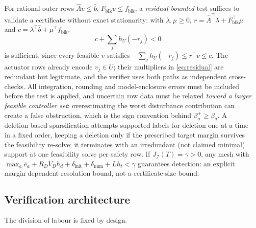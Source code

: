 \documentclass[11pt,a4paper]{article}
\theoremstyle{plain}
\theoremstyle{definition}
\theoremstyle{remark}
\newcommand{\calI}{\mathcal{I}}
\newcommand{\J}{J_{\calI}(T)}
\newcommand{\ebar}{\bar{e}}
\begin{document}
For rational outer rows $\widehat Av\le\widehat b$, $F_{\mathrm{blk}}v\le f_{\mathrm{blk}}$, a \emph{residual-bounded} test suffices to validate a certificate without exact stationarity: with $\lambda,\mu\ge0$, $r=\widehat A^\top\lambda+F_{\mathrm{blk}}^\top\mu$ and $c=\lambda^\top\widehat b+\mu^\top f_{\mathrm{blk}}$,
\begin{equation}\label{eq:residual}
c+\sum_jh_U(-r_j)<0
\end{equation}
is sufficient, since every feasible $v$ satisfies $-\sum_jh_U(-r_j)\le r^\top v\le c$. The actuator rows already encode $v_j\in U$; their multipliers in \eqref{eq:residual} are redundant but legitimate, and the verifier uses both paths as independent cross-checks. All integration, rounding and model-enclosure errors must be included before the test is applied, and uncertain row data must be relaxed \emph{toward a larger feasible controller set}: overestimating the worst disturbance contribution can create a false obstruction, which is the sign convention behind $\beta^+_a\ge\beta_a$. A deletion-based sparsification attempts supported labels for deletion one at a time in a fixed order, keeping a deletion only if the prescribed target margin survives the feasibility re-solve; it terminates with an irredundant (not claimed minimal) support at one feasibility solve per safety row. If $\J=\gamma>0$, any mesh with $\max_a\ebar_a+R_DV_Dh_d+\delta_{\mathrm{init}}+\delta_{\mathrm{num}}+Lh_t<\gamma$ guarantees detection: an explicit margin-dependent resolution bound, not a certificate-size bound.

\subsection{Verification architecture}\label{sec:verification}

The division of labour is fixed by design.
\end{document}
